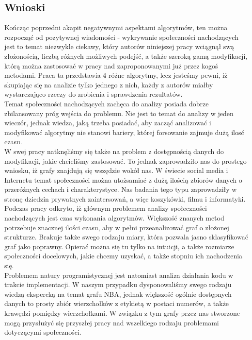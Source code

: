 \documentclass{article}
\begin{document}
\subsection{Wnioski}
Kończąc poprzedni akapit negatywnymi aspektami algorytmów, ten można rozpocząć od pozytywnej wiadomości - wykrywanie społeczności nachodzących jest to temat niezwykle ciekawy, który autorów niniejszej pracy wciągnął swą złożonością, liczbą różnych możliwych podejść, a także szeroką gamą modyfikacji, którą można zastosować w pracy nad zaproponowanymi już przez kogoś metodami. Praca ta przedstawia 4 różne algorytmy, lecz jesteśmy pewni, iż skupiając się na analizie tylko jednego z nich, każdy z autorów miałby wystarczająco rzeczy do zrobienia i sprawdzenia rezultatów. \\

Temat społeczności nachodzących zachęca do analizy posiada dobrze zbilansowany próg wejścia do problemu. Nie jest to temat do analizy w jeden wieczór, jednak wiedza, jaką trzeba posiadać, aby zacząć analizować i modyfikować algorytmy nie stanowi bariery, której forsowanie zajmuje dużą ilosć czasu. \\

W swej pracy natknęliśmy się także na problem z dostępnością danych do modyfikacji, jakie chcieliśmy zastosować. To jednak zaprowadziło nas do prostego wniosku, iż grafy znajdują się wszędzie wokół nas. W świecie social media i Internetu temat społeczności można utożsamiać z dużą ilością zbiorów danych o przeróżnych cechach i charakterystyce. Nas badania tego typu zaprowadziły w stronę dziedzin prywatnych zaintersowań, a więc koszykówki, filmu i informatyki. \\

Podczas pracy odkryto, iż głównym problemem analizy społeczności nachodzących jest czas wykonania algorytmów. Większość znanych metod potrzebuje znacznej ilości czasu, aby w pełni przeanalizować graf o złożonej strukturze. Brakuje także swego rodzaju miary, która pozwala jasno sklasyfikować graf jako poprawny. Opierać można się tu tylko na intuicji, a także rozmiarze społeczności docelowych, jakie chcemy uzyskać, a także stopniu ich nachodzenia się. \\

Problemem natury programistycznej jest natomiast analiza działania kodu w trakcie implementacji. W naszym przypadku dysponowaliśmy swego rodzaju wiedzą ekspercką na temat grafu NBA, jednak większość ogólnie dostępnych danych to prosty zbiór wierzchołków z etykietą w postaci numerów, a także krawędzi pomiędzy wierzchołkami. W związku z tym grafy przez nas stworzone mogą przysłużyć się przyszłej pracy nad wszelkiego rodzaju problemami dotyczącymi społeczności. \\
\end{document}
